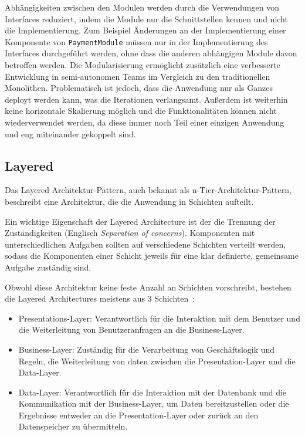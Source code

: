 \documentclass[acmtog]{acmart}
\begin{document}
Abhängigkeiten zwischen den Modulen werden durch die Verwendungen von Interfaces
reduziert, indem die Module nur die Schnittstellen kennen und nicht die Implementierung.
Zum Beispiel Änderungen an der Implementierung einer Komponente von \texttt{PaymentModule} müssen nur
in der Implementierung des Interfaces durchgeführt werden, ohne dass die anderen
abhängigen Module davon betroffen werden.
Die Modularisierung ermöglicht zusätzlich eine verbesserte Entwicklung in semi-autonomen Teams im
Vergleich zu den traditionellen Monolithen.
Problematisch ist jedoch, dass die Anwendung nur als Ganzes deployt werden kann, was
die Iterationen verlangsamt.
Außerdem ist weiterhin keine horizontale Skalierung möglich und die Funktionalitäten
können nicht wiederverwendet werden, da diese immer noch Teil einer einzigen Anwendung
und eng miteinander gekoppelt sind.

\subsection{Layered}
Das Layered Architektur-Pattern, auch bekannt als n-Tier-Architektur-Pattern, beschreibt eine
Architektur, die die Anwendung in Schichten aufteilt.

Ein wichtige Eigenschaft der Layered Architecture ist der die Trennung der Zuständigkeiten
(Englisch \textit{Separation of concerns}). Komponenten mit unterschiedlichen Aufgaben sollten
auf verschiedene Schichten verteilt werden, sodass die Komponenten einer Schicht jeweils für
eine klar definierte, gemeinsame Aufgabe zuständig sind. \cite[S. 34]{layered2}

Obwohl diese Architektur keine feste Anzahl an Schichten vorschreibt,
bestehen die Layered Architectures meistens aus 3 Schichten~\cite []{layered2}:
\begin{itemize}
\item Presentations-Layer: Verantwortlich für die Interaktion mit dem Benutzer und
die Weiterleitung von Benutzeranfragen an die Business-Layer.
\item Business-Layer: Zuständig für die Verarbeitung von Geschäftslogik und Regeln, die Weiterleitung von daten zwischen
  die Presentation-Layer und die Data-Layer.
\item Data-Layer: Verantwortlich für die Interaktion mit der Datenbank und die Kommunikation mit der Business-Layer,
um Daten bereitzustellen oder die Ergebnisse entweder an die Presentation-Layer
  oder zurück an den Datenspeicher zu übermitteln.
\end{itemize}
\end{document}
